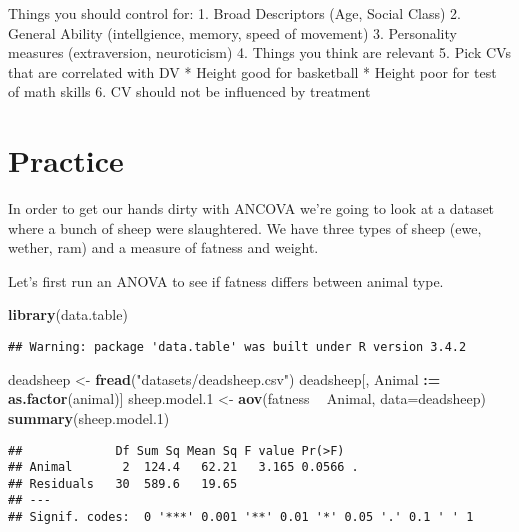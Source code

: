 \documentclass[]{book}
\newenvironment{Shaded}{\begin{snugshade}}{\end{snugshade}}
\newcommand{\KeywordTok}[1]{\textcolor[rgb]{0.13,0.29,0.53}{\textbf{#1}}}
\newcommand{\DataTypeTok}[1]{\textcolor[rgb]{0.13,0.29,0.53}{#1}}
\newcommand{\DecValTok}[1]{\textcolor[rgb]{0.00,0.00,0.81}{#1}}
\newcommand{\StringTok}[1]{\textcolor[rgb]{0.31,0.60,0.02}{#1}}
\newcommand{\OperatorTok}[1]{\textcolor[rgb]{0.81,0.36,0.00}{\textbf{#1}}}
\newcommand{\ErrorTok}[1]{\textcolor[rgb]{0.64,0.00,0.00}{\textbf{#1}}}
\newcommand{\NormalTok}[1]{#1}
\theoremstyle{definition}
\theoremstyle{definition}
\theoremstyle{definition}
\theoremstyle{remark}
\begin{document}
Things you should control for: 1. Broad Descriptors (Age, Social Class)
2. General Ability (intellgience, memory, speed of movement) 3.
Personality measures (extraversion, neuroticism) 4. Things you think are
relevant 5. Pick CVs that are correlated with DV * Height good for
basketball * Height poor for test of math skills 6. CV should not be
influenced by treatment

\section{Practice}\label{practice}

In order to get our hands dirty with ANCOVA we're going to look at a
dataset where a bunch of sheep were slaughtered. We have three types of
sheep (ewe, wether, ram) and a measure of fatness and weight.

Let's first run an ANOVA to see if fatness differs between animal type.

\begin{Shaded}
\begin{Highlighting}[]
\KeywordTok{library}\NormalTok{(data.table)}
\end{Highlighting}
\end{Shaded}

\begin{verbatim}
## Warning: package 'data.table' was built under R version 3.4.2
\end{verbatim}

\begin{Shaded}
\begin{Highlighting}[]
\NormalTok{deadsheep <-}\StringTok{ }\KeywordTok{fread}\NormalTok{(}\StringTok{"datasets/deadsheep.csv"}\NormalTok{)}
\NormalTok{deadsheep[, Animal }\OperatorTok{:}\ErrorTok{=}\StringTok{ }\KeywordTok{as.factor}\NormalTok{(animal)]}
\NormalTok{sheep.model.}\DecValTok{1}\NormalTok{ <-}\StringTok{ }\KeywordTok{aov}\NormalTok{(fatness }\OperatorTok{~}\StringTok{ }\NormalTok{Animal, }\DataTypeTok{data=}\NormalTok{deadsheep)}
\KeywordTok{summary}\NormalTok{(sheep.model.}\DecValTok{1}\NormalTok{)}
\end{Highlighting}
\end{Shaded}

\begin{verbatim}
##             Df Sum Sq Mean Sq F value Pr(>F)  
## Animal       2  124.4   62.21   3.165 0.0566 .
## Residuals   30  589.6   19.65                 
## ---
## Signif. codes:  0 '***' 0.001 '**' 0.01 '*' 0.05 '.' 0.1 ' ' 1
\end{verbatim}
\end{document}
